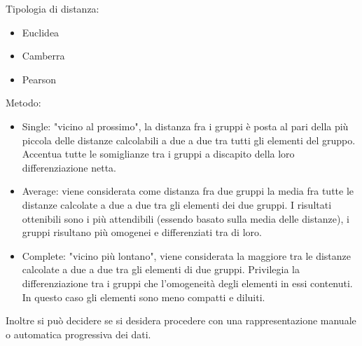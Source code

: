 \item Tipologia di distanza:
\begin{itemize}
\item Euclidea
\item Camberra
\item Pearson
\end{itemize}
\item Metodo:
\begin{itemize}
\item Single: "vicino al prossimo", la distanza fra i gruppi \`e posta al pari della pi\`u piccola delle distanze calcolabili a due a due tra tutti gli elementi del gruppo. Accentua tutte le somiglianze tra i gruppi a discapito  della loro differenziazione netta.
\item Average: viene considerata come distanza fra due gruppi la media fra tutte le distanze calcolate a due a due tra gli elementi dei due gruppi. I risultati ottenibili sono i pi\`u attendibili (essendo basato sulla media delle distanze), i gruppi risultano pi\`u omogenei e differenziati tra di loro.
\item Complete: "vicino pi\`u lontano", viene considerata la maggiore tra le distanze calcolate a due a due tra gli elementi di due gruppi. Privilegia la differenziazione tra i gruppi che l'omogeneit\`a degli elementi in essi contenuti. In questo caso gli elementi sono meno compatti e diluiti.
\end{itemize}
Inoltre si pu\`o decidere se si desidera procedere con una rappresentazione manuale o automatica progressiva dei dati.

